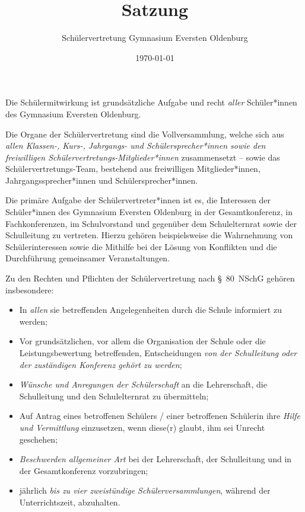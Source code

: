 \documentclass[10pt,a4paper,oneside,parskip=half]{scrartcl}
\title{Satzung}
\date{\today}
\author{Schülervertretung Gymnasium Eversten Oldenburg}
\begin{document}
\maketitle

\begin{contract}

Die Schülermitwirkung ist grundsätzliche Aufgabe und recht \emph{aller} Schüler*innen des Gymnasium Eversten Oldenburg.

Die Organe der Schülervertretung sind die Vollversammlung, welche sich aus \emph{allen Klassen-, Kurs-, Jahrgangs- und Schülersprecher*innen sowie den freiwilligen Schülervertretungs-Mitglieder*innen} zusammensetzt -- sowie das Schülervertretungs-Team, bestehend aus freiwilligen Mitglieder*innen, Jahrgangssprecher*innen und Schülersprecher*innen.

Die primäre Aufgabe der Schülervertreter*innen ist es, die Interessen der Schüler*innen des Gymnasium Eversten Oldenburg in der Gesamtkonferenz, in Fachkonferenzen, im Schulvorstand und gegenüber dem Schulelternrat sowie der Schulleitung zu vertreten. Hierzu gehören beispielsweise die Wahrnehmung von Schülerinteressen sowie die Mithilfe bei der Lösung von Konflikten und die Durchführung gemeinsamer Veranstaltungen.

Zu den Rechten und Pflichten der Schülervertretung nach §~80~NSchG gehören insbesondere:
\begin{itemize}
\item In \emph{allen} sie betreffenden Angelegenheiten durch die Schule informiert zu werden;
\item Vor grundsätzlichen, vor allem die Organisation der Schule oder die Leistungsbewertung betreffenden, Entscheidungen \emph{von der Schulleitung oder der zuständigen Konferenz gehört zu werden};
\item \emph{Wünsche und Anregungen der Schülerschaft} an die Lehrerschaft, die Schulleitung und den Schulelternrat zu übermitteln;
\item Auf Antrag eines betroffenen Schülers / einer betroffenen Schülerin ihre \emph{Hilfe und Vermittlung} einzusetzen, wenn diese(r) glaubt, ihm sei Unrecht geschehen;
\item \emph{Beschwerden allgemeiner Art} bei der Lehrerschaft, der Schulleitung und in der Gesamtkonferenz vorzubringen;
\item jährlich \emph{bis zu vier zweistündige Schülerversammlungen}, während der Unterrichtszeit, abzuhalten.
\end{itemize}


\end{contract}
\end{document}

